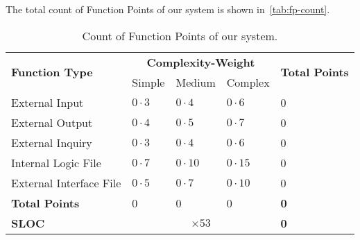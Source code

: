 The total count of Function Points of our system is shown in~\autoref{tab:fp-count}.
\begin{table}[h]
    \centering
    \begin{tabular}{| l | l | l | l | l |}
        \hline
        \multirow{2}{*}{\textbf{Function Type}} & \multicolumn{3}{c|}{\textbf{Complexity-Weight}} & \multirow{2}{*}{\textbf{Total Points}} \\
        \cline{2-4}
        & Simple & Medium & Complex & \\
        \hline
        External Input          & $0 \cdot 3$     & $0 \cdot 4$     & $0 \cdot 6$     & 0     \\
        External Output         & $0 \cdot 4$     & $0 \cdot 5$     & $0 \cdot 7$     & 0     \\
        External Inquiry        & $0 \cdot 3$     & $0 \cdot 4$     & $0 \cdot 6$     & 0     \\
        Internal Logic File     & $0 \cdot 7$     & $0 \cdot 10$    & $0 \cdot 15$    & 0     \\
        External Interface File & $0 \cdot 5$     & $0 \cdot 7$     & $0 \cdot 10$    & 0     \\
        \hline
        \textbf{Total Points} & 0 & 0 & 0 & \textbf{0} \\
        \hline
        \textbf{SLOC} & \multicolumn{3}{|c|}{$\times 53$} & \textbf{0}\\
        \hline
    \end{tabular}
    \caption{Count of Function Points of our system.}
    \label{tab:fp-count}
\end{table}
